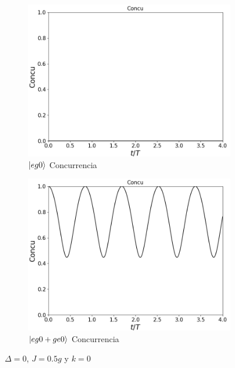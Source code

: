 \begin{figure}[H]
\begin{subfigure}{0.49\textwidth}
        \label{fig4:pob j eg0 sim}
    \end{subfigure}
    \vfill
    \begin{subfigure}{0.49\textwidth}
        \includegraphics[width=\textwidth]{figuras/ch4/j eg0 concu.png}
        \caption{$\ket{eg0}$ Concurrencia}
        \label{fig4:pob j eg0}
    \end{subfigure}
    \hfill
    \begin{subfigure}{0.49\textwidth}
        \includegraphics[width=\textwidth]{figuras/ch4/j eg0+ge0 concu.png}
        \caption{$\ket{eg0+ge0}$ Concurrencia}
        \label{fig4:pob j eg0 sim}
    \end{subfigure}
    \caption{$\Delta=0$, $J=0.5g$ y $k=0$}
    \label{fig4:j alpha0}
\end{figure}
